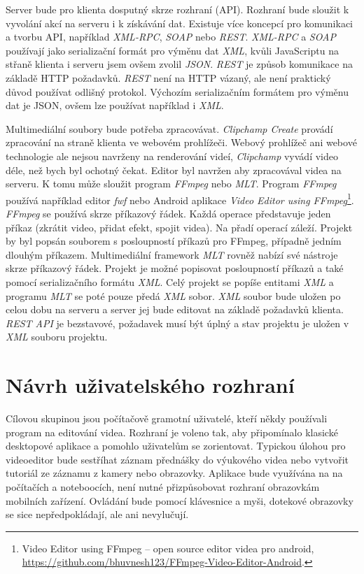 Server bude pro klienta dosputný skrze rozhraní (API). Rozhraní bude sloužit k vyvolání akcí na serveru i k získávání dat. Existuje více koncepcí pro komunikaci a tvorbu API, například \textit{XML-RPC}, \textit{SOAP} nebo \textit{REST}. \textit{XML-RPC} a \textit{SOAP} používají jako serializační formát pro výměnu dat \textit{XML}, kvůli JavaScriptu na střaně klienta i serveru jsem ovšem zvolil \textit{JSON}. \textit{REST} je způsob komunikace na základě HTTP požadavků. \textit{REST} není na HTTP vázaný, ale není praktický důvod používat odlišný protokol. Výchozím serializačním formátem pro výměnu dat je JSON, ovšem lze používat například i \textit{XML}.

Multimediální soubory bude potřeba zpracovávat. \textit{Clipchamp Create} provádí zpracování na straně klienta ve webovém prohlížeči. Webový prohlížeč ani webové technologie ale nejsou navrženy na renderování videí, \textit{Clipchamp} vyvádí video déle, než bych byl ochotný čekat. Editor byl navržen aby zpracovával videa na serveru. K tomu může sloužit program \textit{FFmpeg} nebo \textit{MLT}. Program \textit{FFmpeg} používá například editor \textit{fwf} nebo Android aplikace \textit{Video Editor using FFmpeg}\footnote{Video Editor using FFmpeg -- open source editor videa pro android, \url{https://github.com/bhuvnesh123/FFmpeg-Video-Editor-Android}.}. \textit{FFmpeg} se používá skrze příkazový řádek. Každá operace představuje jeden příkaz (zkrátit video, přidat efekt, spojit videa). Na přadí operací záleží. Projekt by byl popsán souborem s posloupností příkazů pro FFmpeg, případně jedním dlouhým příkazem. Multimediální framework \textit{MLT} rovněž nabízí své nástroje skrze příkazový řádek. Projekt je možné popisovat posloupností příkazů a také pomocí serializačního formátu \textit{XML}. Celý projekt se popíše entitami \textit{XML} a programu \textit{MLT} se poté pouze předá \textit{XML} sobor. \textit{XML} soubor bude uložen po celou dobu na serveru a server jej bude editovat na základě požadavků klienta. \textit{REST API} je bezstavové, požadavek musí být úplný a stav projektu je uložen v \textit{XML} souboru projektu.

\section{Návrh uživatelského rozhraní}
Cílovou skupinou jsou počítačově gramotní uživatelé, kteří někdy používali program na editování videa. Rozhraní je voleno tak, aby připomínalo klasické desktopové aplikace a pomohlo uživatelům se zorientovat. Typickou úlohou pro videoeditor bude sestříhat záznam přednášky do výukového videa nebo vytvořit tutoriál ze záznamu z kamery nebo obrazovky. Aplikace bude využívána na na počítačích a noteboocích, není nutné přizpůsobovat rozhraní obrazovkám mobilních zařízení. Ovládání bude pomocí klávesnice a myši, dotekové obrazovky se sice nepředpokládají, ale ani nevylučují.

